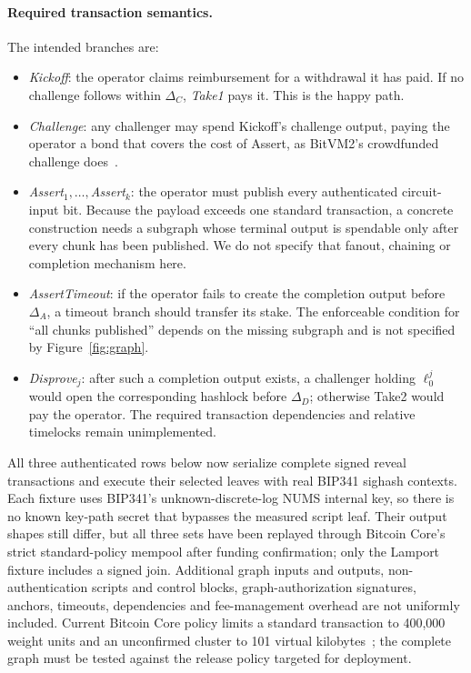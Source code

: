\documentclass[11pt]{article}
\begin{document}
\paragraph{Required transaction semantics.} The intended branches are:
\begin{itemize}
  \item \emph{Kickoff}: the operator claims reimbursement for a withdrawal it has
    paid. If no challenge follows within $\Delta_C$, \emph{Take1} pays it. This is
    the happy path.
  \item \emph{Challenge}: any challenger may spend Kickoff's challenge output,
    paying the operator a bond that covers the cost of Assert, as BitVM2's
    crowdfunded challenge does~\cite{laa25bitvm2}.
  \item \emph{Assert$_1,\dots,$Assert$_k$}: the operator must publish every
    authenticated circuit-input bit. Because the payload exceeds one standard
    transaction, a concrete construction needs a subgraph whose terminal output
    is spendable only after every chunk has been published. We do not specify
    that fanout, chaining or completion mechanism here.
  \item \emph{AssertTimeout}: if the operator fails to create the completion
    output before $\Delta_A$, a timeout branch should transfer its stake. The
    enforceable condition for ``all chunks published'' depends on the missing
    subgraph and is not specified by Figure~\ref{fig:graph}.
  \item \emph{Disprove$_j$}: after such a completion output exists, a challenger
    holding $\ell^j_0$ would open the corresponding hashlock before $\Delta_D$;
    otherwise Take2 would pay the operator. The required transaction
    dependencies and relative timelocks remain unimplemented.
\end{itemize}
All three authenticated rows below now serialize complete signed reveal
transactions and execute their selected leaves with real BIP341 sighash
contexts. Each fixture uses BIP341's unknown-discrete-log NUMS internal key, so
there is no known key-path secret that bypasses the measured script leaf. Their
output shapes still differ, but all three sets have been replayed through
Bitcoin Core's strict standard-policy mempool after funding confirmation; only
the Lamport fixture includes a signed join. Additional graph inputs and outputs,
non-authentication scripts and control blocks, graph-authorization signatures,
anchors, timeouts, dependencies and fee-management overhead are not uniformly
included. Current Bitcoin Core policy limits a standard transaction to
400{,}000 weight units and an unconfirmed cluster to 101 virtual
kilobytes~\cite{bitcoincorepolicy}; the complete graph must be tested against
the release policy targeted for deployment.
\end{document}
